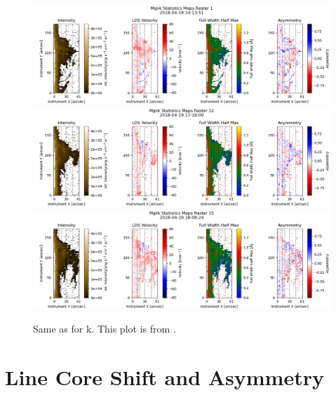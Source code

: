\begin{figure}
    \includegraphics[width=\linewidth]{./01Observations/figs/20180419/kmaps0.png}
    \includegraphics[width=\linewidth]{./01Observations/figs/20180419/kmaps1.png}
    \includegraphics[width=\linewidth]{./01Observations/figs/20180419/kmaps2.png}
    \caption[\mgii~k statistics maps of the three main stages of the prominence.]{Same as  for \mgii{}k. This plot is from \cite{peat_solar_2021}.}
    \label{fig:kmaps}
\end{figure}

\section{Line Core Shift and Asymmetry}
\label{velsect}

